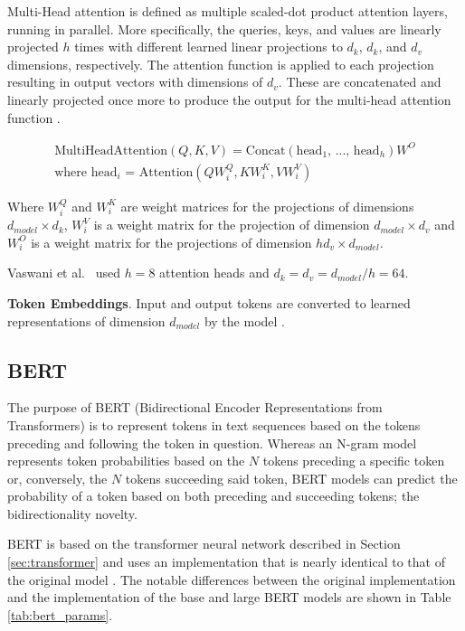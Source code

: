 \documentclass[12pt]{article}
\begin{document}
Multi-Head attention is defined as multiple scaled-dot product attention layers, running in parallel. More specifically, the queries, keys, and values
are linearly projected $h$ times with different learned linear projections to $d_k$, $d_k$, and $d_v$ dimensions, respectively. The attention function
is applied to each projection resulting in output vectors with dimensions of $d_v$. These are concatenated and linearly projected once more to produce
the output for the multi-head attention function \cite{vaswani_attention_2017}.

\begin{equation}\label{eq:multi_head_attention}
    \begin{gathered}
        \mbox{MultiHeadAttention}(Q,K,V) = \mbox{Concat}(\mbox{head$_1$, ..., head$_h$})W^O\\
        \mbox{where head$_i$ = Attention}(QW_i^Q, KW_i^K, VW_i^V)
    \end{gathered}
\end{equation}

\noindent
Where $W_i^Q$ and $W_i^K$ are weight matrices for the projections of dimensions $d_{model} \times d_k$, $W_i^V$ is a weight matrix for the projection
of dimension $d_{model} \times d_v$ and $W_i^O$ is a weight matrix for the projections of dimension $h d_v \times d_{model}$.

Vaswani et al.~\cite{vaswani_attention_2017} used $h = 8$ attention heads and $d_k = d_v = d_{model} / h = 64$.

\textbf{Token Embeddings}. Input and output tokens are converted to learned representations of dimension $d_{model}$ by the model
\cite{vaswani_attention_2017}.

\subsection{BERT}\label{sec:bert}
The purpose of BERT (Bidirectional Encoder Representations from Transformers) is to represent tokens in text sequences based on the tokens preceding
and following the token in question. Whereas an N-gram model represents token probabilities based on the $N$ tokens preceding a specific token or,
conversely, the $N$ tokens succeeding said token, BERT models can predict the probability of a token based on both preceding and succeeding tokens;
the bidirectionality novelty.

BERT is based on the transformer neural network described in Section \ref{sec:transformer} and uses an implementation that is nearly identical to that
of the original model \cite{devlin_bert_2019,vaswani_attention_2017}. The notable differences between the original implementation and the
implementation of the base and large BERT models are shown in Table \ref{tab:bert_params}.
\end{document}
